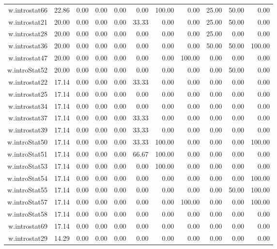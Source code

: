 \documentclass[12pt,english,nohyper]{tufte-handout}\usepackage[]{graphicx}\usepackage[]{color}
\begin{document}
\begin{longtable}{rrrrrrrrrrr}
  w.introstat66 & 22.86 & 0.00 & 0.00 & 0.00 & 0.00 & 100.00 & 0.00 & 25.00 & 50.00 & 0.00 \\ 
  w.introstat21 & 20.00 & 0.00 & 0.00 & 0.00 & 33.33 & 0.00 & 0.00 & 25.00 & 50.00 & 0.00 \\ 
  w.introstat28 & 20.00 & 0.00 & 0.00 & 0.00 & 0.00 & 0.00 & 0.00 & 25.00 & 0.00 & 0.00 \\ 
  w.introstat36 & 20.00 & 0.00 & 0.00 & 0.00 & 0.00 & 0.00 & 0.00 & 50.00 & 50.00 & 100.00 \\ 
  w.introstat47 & 20.00 & 0.00 & 0.00 & 0.00 & 0.00 & 0.00 & 100.00 & 0.00 & 0.00 & 0.00 \\ 
  w.introStat52 & 20.00 & 0.00 & 0.00 & 0.00 & 0.00 & 0.00 & 0.00 & 0.00 & 50.00 & 0.00 \\ 
  w.introstat22 & 17.14 & 0.00 & 0.00 & 0.00 & 33.33 & 0.00 & 0.00 & 0.00 & 0.00 & 0.00 \\ 
  w.introstat25 & 17.14 & 0.00 & 0.00 & 0.00 & 0.00 & 0.00 & 0.00 & 0.00 & 0.00 & 0.00 \\ 
  w.introstat34 & 17.14 & 0.00 & 0.00 & 0.00 & 0.00 & 0.00 & 0.00 & 0.00 & 0.00 & 0.00 \\ 
  w.introstat37 & 17.14 & 0.00 & 0.00 & 0.00 & 33.33 & 0.00 & 0.00 & 0.00 & 0.00 & 0.00 \\ 
  w.introstat39 & 17.14 & 0.00 & 0.00 & 0.00 & 33.33 & 0.00 & 0.00 & 0.00 & 0.00 & 0.00 \\ 
  w.introStat50 & 17.14 & 0.00 & 0.00 & 0.00 & 33.33 & 100.00 & 0.00 & 0.00 & 0.00 & 100.00 \\ 
  w.introStat51 & 17.14 & 0.00 & 0.00 & 0.00 & 66.67 & 100.00 & 0.00 & 0.00 & 0.00 & 0.00 \\ 
  w.introStat53 & 17.14 & 0.00 & 0.00 & 0.00 & 0.00 & 100.00 & 0.00 & 0.00 & 0.00 & 0.00 \\ 
  w.introStat54 & 17.14 & 0.00 & 0.00 & 0.00 & 0.00 & 0.00 & 0.00 & 0.00 & 0.00 & 100.00 \\ 
  w.introStat55 & 17.14 & 0.00 & 0.00 & 0.00 & 0.00 & 0.00 & 0.00 & 0.00 & 50.00 & 100.00 \\ 
  w.introStat57 & 17.14 & 0.00 & 0.00 & 0.00 & 0.00 & 0.00 & 100.00 & 0.00 & 0.00 & 100.00 \\ 
  w.introStat58 & 17.14 & 0.00 & 0.00 & 0.00 & 0.00 & 0.00 & 0.00 & 0.00 & 0.00 & 0.00 \\ 
  w.introstat69 & 17.14 & 0.00 & 0.00 & 0.00 & 0.00 & 0.00 & 0.00 & 0.00 & 0.00 & 0.00 \\ 
  w.introstat29 & 14.29 & 0.00 & 0.00 & 0.00 & 0.00 & 0.00 & 0.00 & 0.00 & 0.00 & 0.00 \\ 

\end{longtable}
\end{document}
